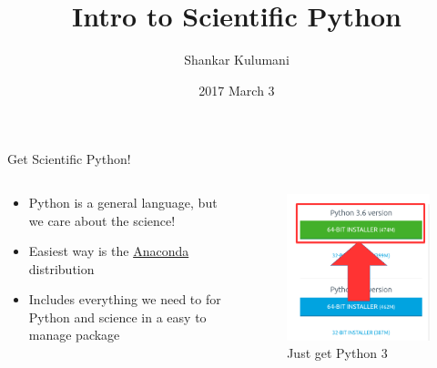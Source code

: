 \documentclass[11pt,professionalfonts,aspectratio=169,final]{beamer}
\title[Why Python?]{\large\bf  Intro to Scientific Python}
\author[FDCL]{Shankar Kulumani}
\date{2017 March 3}
\institute{
\large{\textbf{Flight Dynamics \& Control Lab}}\\
  \begin{figure} %
        \texttt{[image: gw\_txh\_2cs\_pos]}
    \end{figure}
}
\begin{document}
\setcounter{framenumber}{-1}
\begin{frame} %
  \titlepage
\end{frame}   %

\begin{frame}{Get Scientific Python!}
\begin{columns}
\begin{column}{0.5\textwidth}
\begin{itemize}
    \item Python is a general language, but we care about the science!
    \item Easiest way is the \href{https://www.continuum.io/downloads}{Anaconda} distribution
    \item Includes everything we need to for Python and science in a easy to manage package
\end{itemize}
\end{column}
\begin{column}{0.5\textwidth}
    \begin{figure}
        \centering
        \includegraphics[width=\columnwidth,height=0.8\textheight,keepaspectratio]{figures/anaconda3.png}
        \caption{Just get Python 3}
    \end{figure}
\end{column}
\end{columns}
\end{frame}
\end{document}

